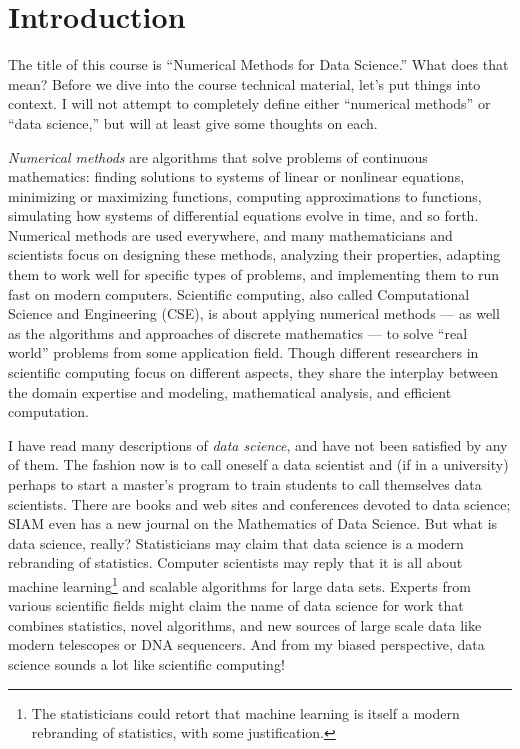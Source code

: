 \documentclass[12pt, leqno]{article} %
\begin{document}

\section{Introduction}

The title of this course is ``Numerical Methods for Data Science.''
What does that mean?  Before we dive into the course technical
material, let's put things into context.  I will not attempt to
completely define either ``numerical methods'' or ``data science,''
but will at least give some thoughts on each.

{\em Numerical methods} are algorithms that solve problems of
continuous mathematics: finding solutions to systems of linear or
nonlinear equations, minimizing or maximizing functions, computing
approximations to functions, simulating how systems of differential
equations evolve in time, and so forth.  Numerical methods are used
everywhere, and many mathematicians and scientists focus on designing
these methods, analyzing their properties, adapting them to work well
for specific types of problems, and implementing them to run fast on
modern computers.  Scientific computing, also called Computational
Science and Engineering (CSE), is about applying numerical methods ---
as well as the algorithms and approaches of discrete mathematics ---
to solve ``real world'' problems from some application field.
Though different researchers in scientific computing focus on different
aspects, they share the interplay between the domain expertise and
modeling, mathematical analysis, and efficient computation.

I have read many descriptions of {\em data science}, and have not been
satisfied by any of them.
The fashion now is to call oneself a data
scientist and (if in a university) perhaps to start a master's program
to train students to call themselves data scientists.  There are books
and web sites and conferences devoted to data science; SIAM even has a new
journal on the Mathematics of Data Science.
But what is data science, really?
Statisticians
may claim that data science is a modern rebranding of statistics.
Computer scientists may reply that it is all about machine
learning\footnote{The statisticians could retort that machine learning
  is itself a modern rebranding of statistics, with some
  justification.} and scalable algorithms for large data sets.
Experts from various scientific fields might claim the name of data
science for work that combines statistics, novel algorithms, and new
sources of large scale data like modern telescopes or DNA sequencers.
And from my biased perspective, data science sounds a lot like scientific computing!
\end{document}
